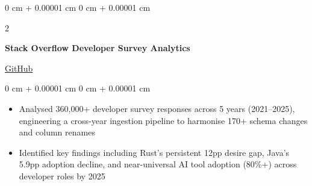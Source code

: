 \documentclass[10pt, letterpaper]{article}
\newenvironment{onecolentry}{
    \begin{adjustwidth}{
        0 cm + 0.00001 cm
    }{
        0 cm + 0.00001 cm
    }
}{
    \end{adjustwidth}
}
\newenvironment{twocolentry}[2][]{
    \onecolentry
    \def\secondColumn{#2}
    \setcolumnwidth{\fill, 4.5 cm}
    \begin{paracol}{2}
}{
    \switchcolumn \raggedleft \secondColumn
    \end{paracol}
    \endonecolentry
}
\begin{document}
\begin{twocolentry}{
    \href{https://github.com/NguyenIslandBoy/stack-overflow-dev-survey}{GitHub}
    }
\textbf{Stack Overflow Developer Survey Analytics}
\end{twocolentry}
\begin{onecolentry}
\begin{itemize}
    \item Analysed 360,000+ developer survey responses across 5 years (2021–2025), engineering a cross-year ingestion pipeline to harmonise 170+ schema changes and column renames
    \item Identified key findings including Rust's persistent 12pp desire gap, Java's 5.9pp adoption decline, and near-universal AI tool adoption (80\%+) across developer roles by 2025
\end{itemize}
\end{onecolentry}
\vspace{0.15cm}


\end{document}
